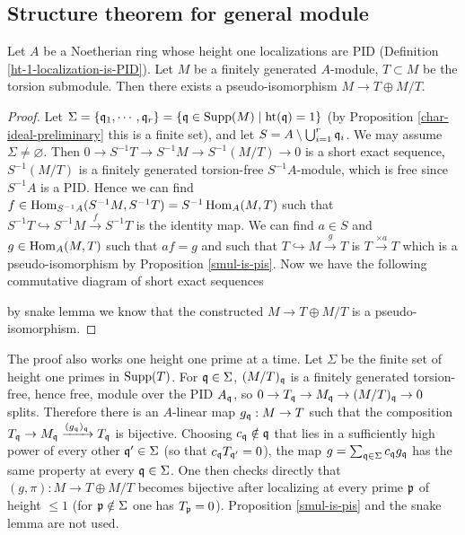 \subsection{Structure theorem for general module}

\begin{prop}
\label{pis-torsion-oplus-torsion-free}
\leanok
Let $A$ be a Noetherian ring whose height one localizations are PID
(Definition \ref{ht-1-localization-is-PID}).
Let $M$ be a finitely generated $A$-module,
$T\subset M$ be the torsion submodule.
Then there exists a pseudo-isomorphism $M\to T\oplus M/T$.
\end{prop}

\begin{proof}
\leanok
Let
$\Sigma=\{{\mathfrak{q}}_1,\cdots,{\mathfrak{q}}_r\}=\{{\mathfrak{q}}\in{\mathrm{Supp}}(M)\mid{\mathrm{ht}}({\mathfrak{q}})=1\}$
(by Proposition \ref{char-ideal-preliminary} this is a finite set),
and let $S=A\setminus\bigcup_{i=1}^r{\mathfrak{q}}_i$.
We may assume $\Sigma\neq\varnothing$.
Then $0\to S^{-1}T\to S^{-1}M\to S^{-1}(M/T)\to 0$ is a short exact sequence,
$S^{-1}(M/T)$ is a finitely generated torsion-free $S^{-1}A$-module,
which is free since $S^{-1}A$ is a PID.
Hence we can find $f\in\operatorname{Hom}_{S^{-1}A}(S^{-1}M,S^{-1}T)=S^{-1}\operatorname{Hom}_A(M,T)$
such that $S^{-1}T\hookrightarrow S^{-1}M\xrightarrow{f}S^{-1}T$
is the identity map.
We can find $a\in S$ and $g\in\operatorname{Hom}_A(M,T)$ such that
$af=g$ and such that $T\hookrightarrow M\xrightarrow{g}T$
is $T\xrightarrow{\times a}T$ which is a pseudo-isomorphism by Proposition \ref{smul-is-pis}.
Now we have the following commutative diagram of short exact sequences
\begin{center}
\end{center}
by snake lemma we know that the constructed $M\to T\oplus M/T$
is a pseudo-isomorphism.
\end{proof}

\begin{remark}
The {\Lean} proof also works one height one prime at a time. Let $\Sigma$ be the
finite set of height one primes in ${\mathrm{Supp}}(T)$. For ${\mathfrak{q}}\in\Sigma$, $(M/T)_{\mathfrak{q}}$
is a finitely generated torsion-free, hence free, module over the PID $A_{\mathfrak{q}}$,
so $0\to T_{\mathfrak{q}}\to M_{\mathfrak{q}}\to(M/T)_{\mathfrak{q}}\to 0$ splits. Therefore there is an
$A$-linear map $g_{\mathfrak{q}}:M\to T$ such that the composition $T_{\mathfrak{q}}\to
M_{\mathfrak{q}}\xrightarrow{(g_{\mathfrak{q}})_{\mathfrak{q}}}T_{\mathfrak{q}}$ is bijective. Choosing $c_{\mathfrak{q}}\notin{\mathfrak{q}}$
that lies in a sufficiently high power of every other ${\mathfrak{q}}'\in\Sigma$ (so that
$c_{\mathfrak{q}} T_{{\mathfrak{q}}'}=0$), the map $g=\sum_{{\mathfrak{q}}\in\Sigma}c_{\mathfrak{q}} g_{\mathfrak{q}}$ has the same
property at every ${\mathfrak{q}}\in\Sigma$. One then checks directly that $(g,\pi):M\to
T\oplus M/T$ becomes bijective after localizing at every prime ${\mathfrak{p}}$ of height
$\leq 1$ (for ${\mathfrak{p}}\notin\Sigma$ one has $T_{\mathfrak{p}}=0$). Proposition
\ref{smul-is-pis} and the snake lemma are not used.
\end{remark}

